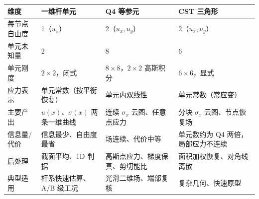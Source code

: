 \begin{tabular}{@{}p{}p{}p{}p{}@{}}
\toprule
维度 & 一维杆单元 & Q4 等参元 & CST 三角形 \\
\midrule
每节点自由度 & 1（$u_x$） & 2（$u_x,u_y$） & 2（$u_x,u_y$） \\
单元未知量 & 2 & 8 & 6 \\
单元刚度 & $2\times2$，闭式 & $8\times8$，$2\times2$ 高斯积分 & $6\times6$，显式 \\
应力表示 & 单元常数（按平衡恢复） & 单元内双线性 & 单元常数（常应变） \\
主要产出 & $u(x)$、$\sigma(x)$ 两条一维曲线 & 连续 $\sigma_x$ 云图、任意点应力 & 分块 $\sigma_x$ 云图、节点恢复场 \\
信息量/代价 & 信息最少、自由度最省 & 场连续、代价中等 & 单元数约为 Q4 两倍，局部应力不连续 \\
后处理 & 截面平均、1D 判据 & 高斯点应力、梯度保真、剪切能比 & 面积加权恢复、对角线离散 \\
典型适用 & 杆系快速估算、A/B 级工况 & 光滑二维场、端部复核 & 复杂几何、快速原型 \\
\bottomrule
\end{tabular}
